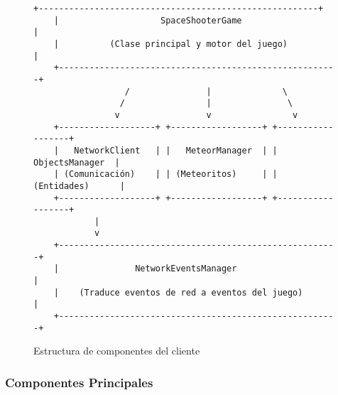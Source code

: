 \documentclass[12pt,letterpaper]{article}
\begin{document}
\begin{figure}[H]
    \centering
    \begin{lstlisting}[language=text]
    +-------------------------------------------------------+
    |                    SpaceShooterGame                   |
    |          (Clase principal y motor del juego)          |
    +-------------------------------------------------------+
                  /               |              \
                 /                |               \
                v                 v                v
    +-------------------+ +------------------+ +------------------+
    |   NetworkClient   | |   MeteorManager  | |  ObjectsManager  |
    | (Comunicación)    | | (Meteoritos)     | | (Entidades)      |
    +-------------------+ +------------------+ +------------------+
            |
            v
    +-------------------------------------------------------+
    |               NetworkEventsManager                    |
    |    (Traduce eventos de red a eventos del juego)       |
    +-------------------------------------------------------+
    \end{lstlisting}
    \caption{Estructura de componentes del cliente}
\end{figure}

\subsubsection{Componentes Principales}
\end{document}
